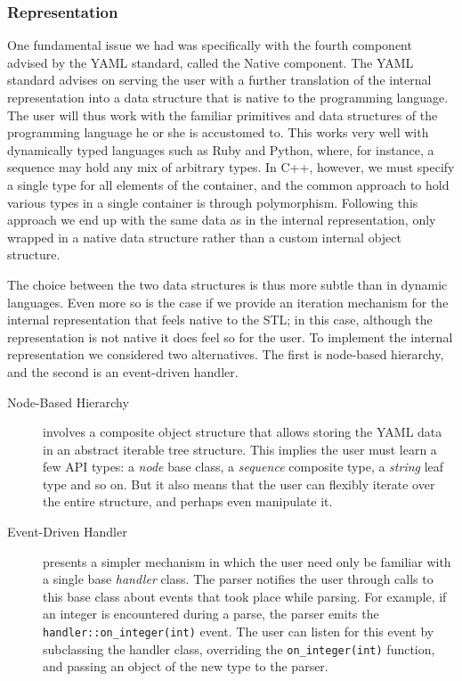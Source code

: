 \documentclass{article}
\begin{document}
\subsubsection{Representation}
One fundamental issue we had was specifically with the fourth component advised 
by the YAML standard, called the Native component.  The YAML standard advises 
on serving the user with a further translation of the internal representation 
into a data structure that is native to the programming language.  The user 
will thus work with the familiar primitives and data structures of the 
programming language he or she is accustomed to.  This works very well with 
dynamically typed languages such as Ruby and Python, where, for instance, a 
sequence may hold any mix of arbitrary types.  In C++, however, we must specify 
a single type for all elements of the container, and the common approach to 
hold various types in a single container is through polymorphism.  Following 
this approach we end up with the same data as in the internal representation, 
only wrapped in a native data structure rather than a custom internal object 
structure.

The choice between the two data structures is thus more subtle than in dynamic 
languages.  Even more so is the case if we provide an iteration mechanism for 
the internal representation that feels native to the STL;  in this case, 
although the representation is not native it does feel so for the user.  To 
implement the internal representation we considered two alternatives.  The 
first is node-based hierarchy, and the second is an event-driven handler.

\begin{description}
  \item[Node-Based Hierarchy] involves a composite object structure that allows 
    storing the YAML data in an abstract iterable tree structure.  This implies 
    the user must learn a few API types:  a \emph{node} base class, a 
    \emph{sequence} composite type, a \emph{string} leaf type and so on.  But 
    it also means that the user can flexibly iterate over the entire structure, 
    and perhaps even manipulate it.
  \item[Event-Driven Handler] presents a simpler mechanism in which the user 
    need only be familiar with a single base \emph{handler} class.  The parser 
    notifies the user through calls to this base class about events that took 
    place while parsing.  For example, if an integer is encountered during a 
    parse, the parser emits the \texttt{handler::on\_integer(int)} event.  The 
    user can listen for this event by subclassing the handler class, overriding 
    the \texttt{on\_integer(int)} function, and passing an object of the new 
    type to the parser.
\end{description}
\end{document}
